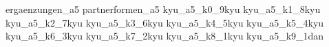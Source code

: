 
\usepackage{import}
\usepackage[backend=biber,style=alphabetic]{biblatex}%

\AtBeginBibliography{\scriptsize}

	\nocite{*}
	{ergaenzungen_a5}\cppb
	{partnerformen_a5}\cppb
	{kyu_a5_k0_9kyu}\cppb
	{kyu_a5_k1_8kyu}\cppb
	{kyu_a5_k2_7kyu}\cppb
	{kyu_a5_k3_6kyu}\cppb
	{kyu_a5_k4_5kyu}\cppb
	{kyu_a5_k5_4kyu}\cppb
	{kyu_a5_k6_3kyu}\cppb
	{kyu_a5_k7_2kyu}\cppb
	{kyu_a5_k8_1kyu}\cppb
	{kyu_a5_k9_1dan}\cppb
	\ClearShipoutPictureFG
	\printbibliography[title={\small Verwendete Literatur und Internetquellen}]

